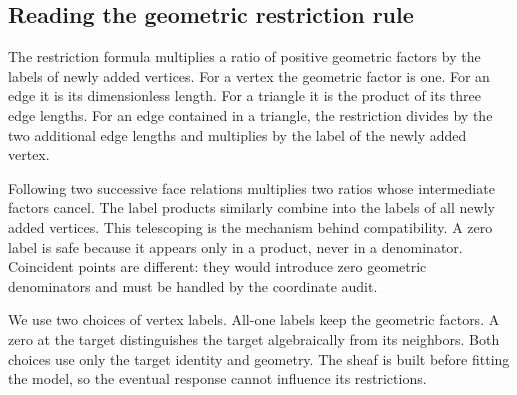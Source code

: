 \subsection{Reading the geometric restriction rule}
The restriction formula multiplies a ratio of positive geometric factors by the labels of newly added vertices. For a vertex the geometric factor is one. For an edge it is its dimensionless length. For a triangle it is the product of its three edge lengths. For an edge contained in a triangle, the restriction divides by the two additional edge lengths and multiplies by the label of the newly added vertex.

Following two successive face relations multiplies two ratios whose intermediate factors cancel. The label products similarly combine into the labels of all newly added vertices. This telescoping is the mechanism behind compatibility. A zero label is safe because it appears only in a product, never in a denominator. Coincident points are different: they would introduce zero geometric denominators and must be handled by the coordinate audit.

We use two choices of vertex labels. All-one labels keep the geometric factors. A zero at the target distinguishes the target algebraically from its neighbors. Both choices use only the target identity and geometry. The sheaf is built before fitting the model, so the eventual response cannot influence its restrictions.
